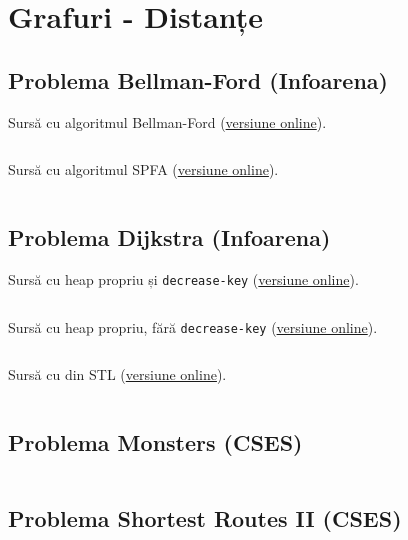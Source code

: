 \documentclass[../main.tex]{subfiles}
\begin{document}
\chapter{Grafuri - Distanțe}

\section{Problema Bellman-Ford (Infoarena)}
\label{code:bellman-ford}

Sursă cu algoritmul Bellman-Ford (\href{https://www.infoarena.ro/job_detail/3198418?action=view-source}{versiune online}).

\inputminted{cpp}{../src/graphs/bellman-ford.cpp}

Sursă cu algoritmul SPFA (\href{https://www.infoarena.ro/job_detail/3341662?action=view-source}{versiune online}).

\inputminted{cpp}{../src/graphs/spfa.cpp}

\section{Problema Dijkstra (Infoarena)}
\label{code:dijkstra}

Sursă cu heap propriu și \texttt{decrease-key} (\href{https://www.infoarena.ro/job_detail/3341774?action=view-source}{versiune online}).

\inputminted{cpp}{../src/graphs/dijkstra-heap-decrease-key.cpp}

Sursă cu heap propriu, fără \texttt{decrease-key} (\href{https://www.infoarena.ro/job_detail/3341775?action=view-source}{versiune online}).

\inputminted{cpp}{../src/graphs/dijkstra-heap-reinsert.cpp}

Sursă cu  din STL (\href{https://www.infoarena.ro/job_detail/3341776?action=view-source}{versiune online}).

\inputminted{cpp}{../src/graphs/dijkstra-priority-queue.cpp}

\section{Problema Monsters (CSES)}
\label{code:monsters}

\inputminted{cpp}{../src/graphs/monsters.cpp}

\section{Problema Shortest Routes II (CSES)}
\label{code:shortest-routes-2}
\end{document}
